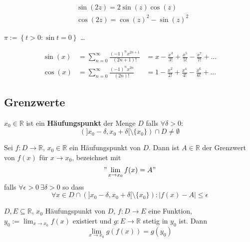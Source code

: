 \documentclass[8pt,a4paper,twocolumn,table]{extarticle}
\newcommand{\R}{\mathbb{R}}
\begin{document}
\begin{korollar}{3.43}
    \begin{align*}
         & \sin(2z) = 2\sin(z)\cos(z)       \\
         & \cos(2z) = \cos(z)^2 - \sin(z)^2
    \end{align*}
\end{korollar}

\begin{satz}{3.44}
    $\pi := \left\{ t > 0 : \sin t = 0 \right\}$ \dots
\end{satz}

\begin{satz}{}
    \begin{alignat*}{2}
        \sin(x) & = \sum_{n = 0}^\infty \frac{(-1)^n x^{2n + 1}}{(2n + 1)!} & = x - \frac{x^3}{3!} + \frac{x^5}{5!} - \frac{x^7}{7!} + ... \\
        \cos(x) & = \sum_{n = 0}^\infty \frac{(-1)^n x^{2n}}{(2n)!}         & = 1 - \frac{x^2}{2!} + \frac{x^4}{4!} - \frac{x^6}{6!} + ...
    \end{alignat*}
\end{satz}

\subsection{Grenzwerte}

\begin{definition}{3.47}
    $x_0 \in \R$ ist ein \textbf{Häufungspunkt} der Menge $D$ falls $\forall \delta > 0$:
    \[ (]x_0 - \delta, x_0 + \delta[ \setminus \{x_0\}) \cap D \ne \emptyset \]
\end{definition}

\begin{definition}{3.49}
    Sei $f: D \to \R$, $x_0 \in \R$ ein Häufungspunkt von $D$. Dann ist $A \in \R$ der Grenzwert von $f(x)$ für $x \to x_0$, bezeichnet mit
    \[ " \lim_{x \to x_0} f(x) = A " \]
    falls $\forall \epsilon > 0\ \exists \delta > 0$ so dass
    \[ \forall x \in D \cap \left(  ]x_0 - \delta, x_0 + \delta[ \setminus \{x_0\}  \right) : |f(x) - A| \le \epsilon \]
\end{definition}

\begin{satz}{3.52}
    $D, E \subseteq \R$, $x_0$ Häufungspunkt von $D$, $f: D \to E$ eine Funktion, $y_0 := \lim_{x \to x_0} f(x)$ existiert und $g: E \to \R$ stetig in $y_0$ ist.
    Dann \[ \lim_{x \to x_0} g(f(x)) = g(y_0) \]
\end{satz}
\end{document}
